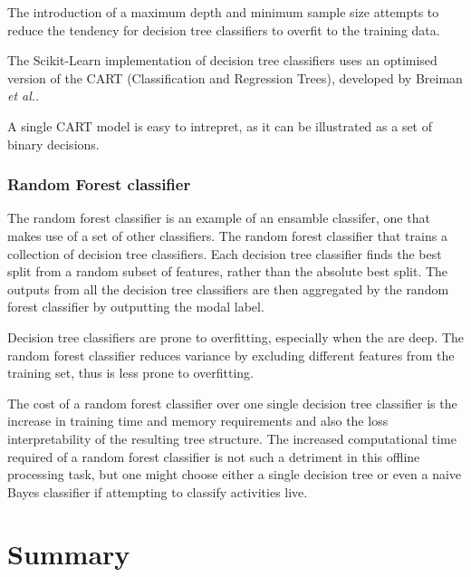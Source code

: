         The introduction of a maximum depth and minimum sample size attempts to reduce the tendency for decision tree classifiers to overfit to the training data.
      
        The Scikit-Learn implementation of decision tree classifiers uses an optimised version of the CART (Classification and Regression Trees), developed by Breiman \emph{et al.}\cite{breiman1984classification}.
        
        A single CART model is easy to intrepret, as it can be illustrated as a set of binary decisions.
        
      
      \subsubsection{Random Forest classifier}
        The random forest classifier is an example of an ensamble classifer, one that makes use of a set of other classifiers. The random forest classifier that trains a collection of decision tree classifiers. Each decision tree classifier finds the best split from a random subset of features, rather than the absolute best split. The outputs from all the decision tree classifiers are then aggregated by the random forest classifier by outputting the modal label.
        
        Decision tree classifiers are prone to overfitting, especially when the are deep. The random forest classifier reduces variance by excluding different features from the training set, thus is less prone to overfitting.
        
        The cost of a random forest classifier over one single decision tree classifier is the increase in training time and memory requirements and also the loss interpretability of the resulting tree structure. The increased computational time required of a random forest classifier is not such a detriment in this offline processing task, but one might choose either a single decision tree or even a naive Bayes classifier if attempting to classify activities live.
  \section{Summary}
